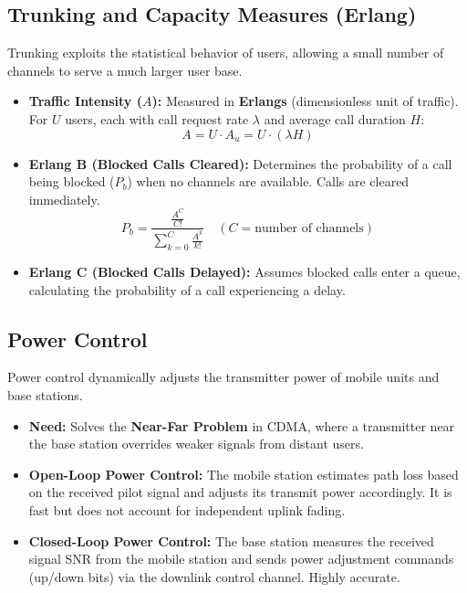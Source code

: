 \documentclass[12pt,a4paper]{article}
\begin{document}
\subsection{Trunking and Capacity Measures (Erlang)}
Trunking exploits the statistical behavior of users, allowing a small number of channels to serve a much larger user base.
\begin{itemize}[leftmargin=*, itemsep=3pt]
  \item \textbf{Traffic Intensity ($A$):} Measured in \textbf{Erlangs} (dimensionless unit of traffic). For $U$ users, each with call request rate $\lambda$ and average call duration $H$:
    \begin{equation}
      A = U \cdot A_u = U \cdot (\lambda H)
    \end{equation}
  \item \textbf{Erlang B (Blocked Calls Cleared):} Determines the probability of a call being blocked ($P_b$) when no channels are available. Calls are cleared immediately.
    \begin{equation}
      P_b = \frac{\frac{A^C}{C!}}{\sum_{k=0}^{C} \frac{A^k}{k!}} \quad (C = \text{number of channels})
    \end{equation}
  \item \textbf{Erlang C (Blocked Calls Delayed):} Assumes blocked calls enter a queue, calculating the probability of a call experiencing a delay.
\end{itemize}

\subsection{Power Control}
Power control dynamically adjusts the transmitter power of mobile units and base stations.
\begin{itemize}[leftmargin=*, itemsep=3pt]
  \item \textbf{Need:} Solves the \textbf{Near-Far Problem} in CDMA, where a transmitter near the base station overrides weaker signals from distant users.
  \item \textbf{Open-Loop Power Control:} The mobile station estimates path loss based on the received pilot signal and adjusts its transmit power accordingly. It is fast but does not account for independent uplink fading.
  \item \textbf{Closed-Loop Power Control:} The base station measures the received signal SNR from the mobile station and sends power adjustment commands (up/down bits) via the downlink control channel. Highly accurate.
\end{itemize}
\end{document}
